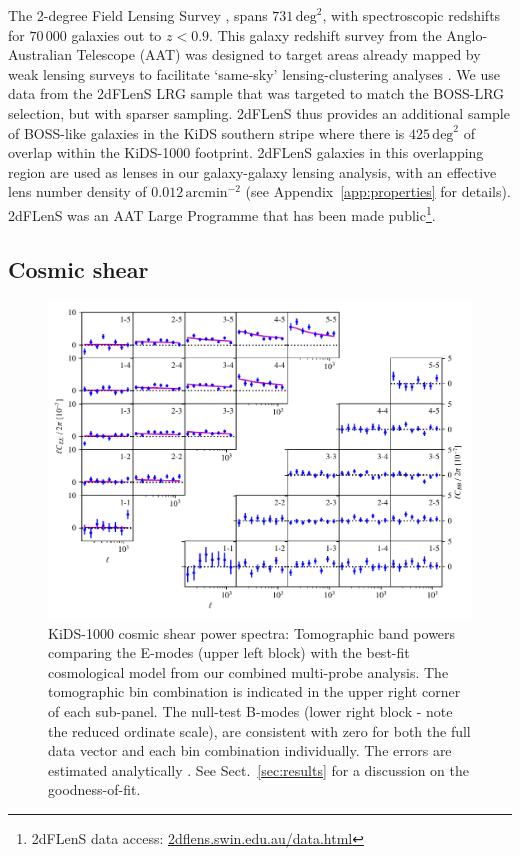 The 2-degree Field Lensing Survey
\citep[2dFLenS,][]{blake/etal:2016}, spans $731\,\mathrm{deg}^{2}$, with
spectroscopic redshifts for $70\,000$ galaxies out to $z<0.9$.   This
galaxy redshift survey from the Anglo-Australian Telescope (AAT) was designed
to target areas already mapped by weak lensing surveys to facilitate `same-sky'
lensing-clustering analyses
\citep{johnson/etal:2017,amon/etal:2018,joudaki/etal:2018, blake/etal:2020}.
We use data from the 2dFLenS LRG sample that was targeted to match
the BOSS-LRG selection, but with sparser sampling.  2dFLenS
thus provides an additional sample of BOSS-like galaxies in the KiDS
southern stripe where there is $425\,\mathrm{deg}^{2}$ of overlap within
the KiDS-1000 footprint.  2dFLenS galaxies in this overlapping region are used as lenses in
our galaxy-galaxy lensing analysis, with an effective lens number density of $0.012\,\mathrm{arcmin}^{-2}$ (see Appendix~\ref{app:properties} for details).  2dFLenS was an AAT Large Programme that has been made public\footnote{2dFLenS data
  access: \href{http://2dflens.swin.edu.au/data.html}{2dflens.swin.edu.au/data.html}}.   

\subsection{Cosmic shear}
\label{sec:cosmic_shear}

\begin{figure}
\begin{centering}
        \includegraphics[width=\textwidth]{Data_Plots/Pkk/Pkk_K1000_2Dbins_v2_goldclasses_Flag_SOM_Fid_C.pdf}
        \caption{KiDS-1000 cosmic shear power spectra:  Tomographic
          band powers comparing the E-modes (upper left block) with the best-fit
          cosmological model from our combined multi-probe analysis.  The tomographic
        bin combination is indicated in the upper right corner of each
      sub-panel.  The null-test B-modes (lower right block - note the reduced ordinate scale), are
      consistent with zero for both the full data vector and each
     bin combination individually.   The errors are estimated analytically \citep{joachimi/etal:inprep}.  See Sect.~\ref{sec:results} for a discussion on the goodness-of-fit.}
        \label{fig:Pkk}
\end{centering}
\end{figure}

